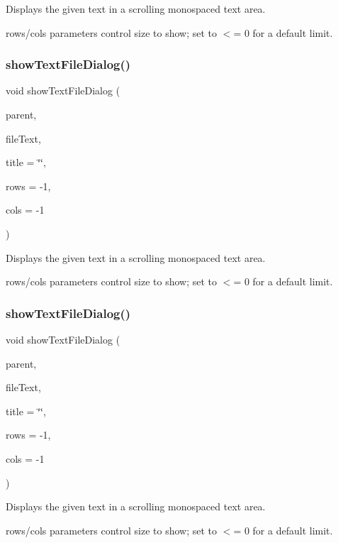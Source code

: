 Displays the given text in a scrolling monospaced text area. 

rows/cols parameters control size to show; set to $<$= 0 for a default limit. \mbox{\label{classsgl_1_1GOptionPane_af8cf594b9d9b1c6569fc8a3ca2ee0602}} 
\subsubsection{\texorpdfstring{show\+Text\+File\+Dialog()}{showTextFileDialog()}\hspace{0.1cm}{\footnotesize\ttfamily [2/3]}}
{\footnotesize\ttfamily void show\+Text\+File\+Dialog (\begin{DoxyParamCaption}\item[{\mbox{\hyperlink{classsgl_1_1GWindow}{G\+Window}} $\ast$}]{parent,  }\item[{const std\+::string \&}]{file\+Text,  }\item[{const std\+::string \&}]{title = {\ttfamily \char`\"{}\char`\"{}},  }\item[{int}]{rows = {\ttfamily -\/1},  }\item[{int}]{cols = {\ttfamily -\/1} }\end{DoxyParamCaption})\hspace{0.3cm}{\ttfamily [static]}}



Displays the given text in a scrolling monospaced text area. 

rows/cols parameters control size to show; set to $<$= 0 for a default limit. \mbox{\label{classsgl_1_1GOptionPane_a6d1d2769369649efbc5142804ff8b165}} 
\subsubsection{\texorpdfstring{show\+Text\+File\+Dialog()}{showTextFileDialog()}\hspace{0.1cm}{\footnotesize\ttfamily [3/3]}}
{\footnotesize\ttfamily void show\+Text\+File\+Dialog (\begin{DoxyParamCaption}\item[{Q\+Widget $\ast$}]{parent,  }\item[{const std\+::string \&}]{file\+Text,  }\item[{const std\+::string \&}]{title = {\ttfamily \char`\"{}\char`\"{}},  }\item[{int}]{rows = {\ttfamily -\/1},  }\item[{int}]{cols = {\ttfamily -\/1} }\end{DoxyParamCaption})\hspace{0.3cm}{\ttfamily [static]}}



Displays the given text in a scrolling monospaced text area. 

rows/cols parameters control size to show; set to $<$= 0 for a default limit. 